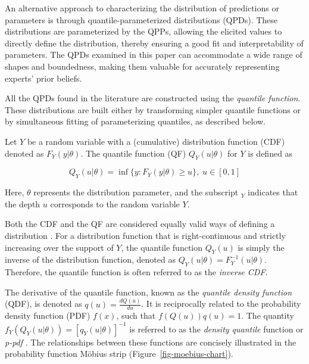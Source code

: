 \documentclass[
  fleqn,
  deca,
  blindrev
]{informs4}
\begin{document}
An alternative approach to characterizing the distribution of
predictions or parameters is through quantile-parameterized
distributions (QPDs). These distributions are parameterized by the QPPs,
allowing the elicited values to directly define the distribution,
thereby ensuring a good fit and interpretability of parameters. The QPDs
examined in this paper can accommodate a wide range of shapes and
boundedness, making them valuable for accurately representing experts'
prior beliefs.

All the QPDs found in the literature are constructed using the
\emph{quantile function}. These distributions are built either by
transforming simpler quantile functions or by simultaneous fitting of
parameterizing quantiles, as described below.

Let \(Y\) be a random variable with a (cumulative) distribution function
(CDF) denoted as \(F_Y(y\vert\theta)\). The quantile function (QF)
\(Q_Y(u\vert\theta)\) for \(Y\) is defined as

\[
Q_Y(u\vert\theta)=\inf\{y:F_Y(y\vert\theta)\geq u\}, \; u\in[0,1]
\]

Here, \(\theta\) represents the distribution parameter, and the
subscript \(_Y\) indicates that the depth \(u\) corresponds to the
random variable \(Y\).

Both the CDF and the QF are considered equally valid ways of defining a
distribution \citep{tukey1965WhichPartSample}. For a distribution
function that is right-continuous and strictly increasing over the
support of \(Y\), the quantile function \(Q_Y(u)\) is simply the inverse
of the distribution function, denoted as
\(Q_Y(u\vert\theta)=F_Y^{-1}(u\vert\theta)\). Therefore, the quantile
function is often referred to as the \emph{inverse CDF}.

The derivative of the quantile function, known as the \emph{quantile
density function} (QDF), is denoted as \(q(u) = \frac{dQ(u)}{du}\). It
is reciprocally related to the probability density function (PDF)
\(f(x)\), such that \(f(Q(u))q(u) = 1\). The quantity
\(f_Y(Q_Y(u\vert\theta))=[q_Y(u\vert\theta)]^{-1}\) is referred to as
the \emph{density quantile} function
\citep{parzen1979NonparametricStatisticalData} or \emph{p-pdf}
\citep{gilchrist2000StatisticalModellingQuantile}. The relationships
between these functions are concisely illustrated in the probability
function Möbius strip (Figure~\ref{fig-moebius-chart}).
\end{document}
